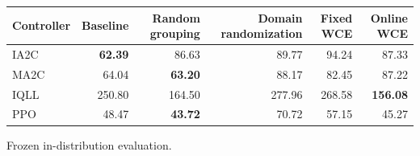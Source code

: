 \begin{tabular}{lrrrrr}
\hline
Controller & Baseline & Random grouping & Domain randomization & Fixed WCE & Online WCE \\
\hline
IA2C & \textbf{62.39} & 86.63 & 89.77 & 94.24 & 87.33 \\
MA2C & 64.04 & \textbf{63.20} & 88.17 & 82.45 & 87.22 \\
IQLL & 250.80 & 164.50 & 277.96 & 268.58 & \textbf{156.08} \\
PPO & 48.47 & \textbf{43.72} & 70.72 & 57.15 & 45.27 \\
\hline
\end{tabular}
Frozen in-distribution evaluation.

